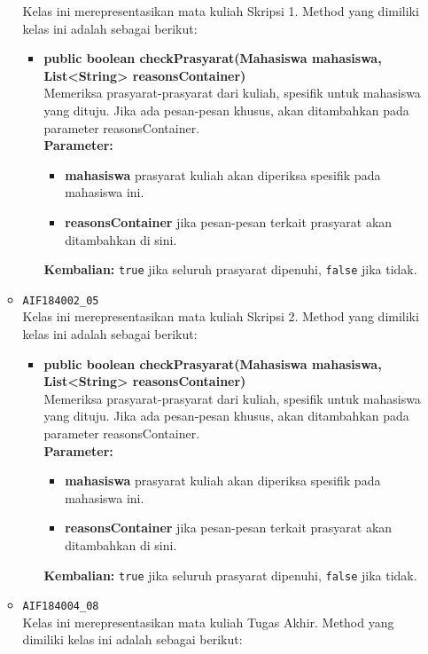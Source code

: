 \begin{enumerate}
\begin{itemize}
		Kelas ini merepresentasikan mata kuliah Skripsi 1. Method yang dimiliki kelas ini adalah sebagai berikut: 
		\begin{itemize}
			\item \textbf{public boolean checkPrasyarat(Mahasiswa mahasiswa, List<String> reasonsContainer)}\\
			Memeriksa prasyarat-prasyarat dari kuliah, spesifik untuk mahasiswa yang dituju. Jika ada pesan-pesan khusus, akan ditambahkan pada parameter reasonsContainer.\\
			\textbf{Parameter:}
			\begin{itemize}
				\item \textbf{mahasiswa} prasyarat kuliah akan diperiksa spesifik pada mahasiswa ini.
				\item \textbf{reasonsContainer} jika pesan-pesan terkait prasyarat akan ditambahkan di sini.
			\end{itemize}
			\textbf{Kembalian:} \texttt{true} jika seluruh prasyarat dipenuhi, \texttt{false} jika tidak.
		\end{itemize}
		\item \texttt{AIF184002\_05} \\
		Kelas ini merepresentasikan mata kuliah Skripsi 2. Method yang dimiliki kelas ini adalah sebagai berikut: 
		\begin{itemize}
			\item \textbf{public boolean checkPrasyarat(Mahasiswa mahasiswa, List<String> reasonsContainer)}\\
			Memeriksa prasyarat-prasyarat dari kuliah, spesifik untuk mahasiswa yang dituju. Jika ada pesan-pesan khusus, akan ditambahkan pada parameter reasonsContainer.\\
			\textbf{Parameter:}
			\begin{itemize}
				\item \textbf{mahasiswa} prasyarat kuliah akan diperiksa spesifik pada mahasiswa ini.
				\item \textbf{reasonsContainer} jika pesan-pesan terkait prasyarat akan ditambahkan di sini.
			\end{itemize}
			\textbf{Kembalian:} \texttt{true} jika seluruh prasyarat dipenuhi, \texttt{false} jika tidak.
		\end{itemize}
		\item \texttt{AIF184004\_08} \\
		Kelas ini merepresentasikan mata kuliah Tugas Akhir. Method yang dimiliki kelas ini adalah sebagai berikut: 
		\begin{itemize}

\end{itemize}
\end{itemize}
\end{enumerate}
